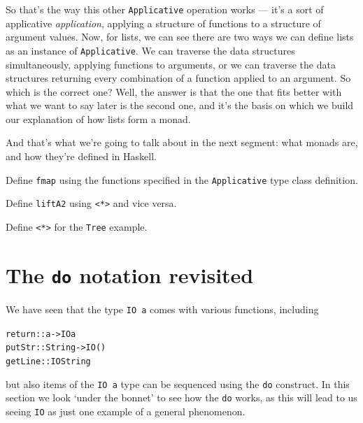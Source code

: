 So that's the way this other \texttt{Applicative} operation works — it's a sort of applicative \emph{application}, applying a structure of functions to a structure of argument values. Now, for lists, we can see there are two ways we can define lists as an instance of \texttt{Applicative}. We can traverse the data structures simultaneously, applying functions to arguments, or we can traverse the data structures returning every combination of a function applied to an argument. So which is the correct one? Well, the answer is that the one that fits better with what we want to say later is the second one, and it's the basis on which we build our explanation of how lists form a monad.

And that's what we're going to talk about in the next segment: what monads are, and how they're defined in Haskell.

\begin{exercises}
 

\item
Define \texttt{fmap} using the functions specified in the \texttt{Applicative} type class definition.

\item
Define \texttt{liftA2} using \texttt{<*>} and vice versa.

\item
Define \texttt{<*>} for the \texttt{Tree} example.

\end{exercises}



\section{The \texttt{do} notation revisited}

We have seen that the type \texttt{IO a} comes with various functions,
including
\begin{alltt}
return  :: a -> IO a
putStr  :: String -> IO ()
getLine :: IO String
\end{alltt}
but also items of the \texttt{IO a} type can be sequenced using the
\texttt{do} construct. In this section we look `under the bonnet' to see
how the \texttt{do} works, as this will lead to us seeing \texttt{IO} as
just one example of a general phenomenon. 

